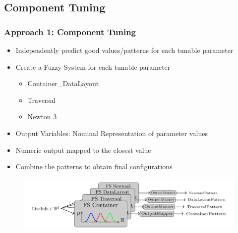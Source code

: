 \documentclass[
	10pt,
	t		%
]{beamer}
\begin{document}
\subsection{Component Tuning}
\begin{frame}
	\frametitle{Approach 1: Component Tuning}
	\begin{itemize}
		\item Independently predict good values/patterns for each tunable parameter
		\item Create a Fuzzy System for each tunable parameter
		      \begin{itemize}
			      \item Container\_DataLayout
			      \item Traversal
			      \item Newton 3
		      \end{itemize}
		\item Output Variables: Nominal Representation of parameter values
		\item Numeric output mapped to the closest value {\footnotesize \cite{Mohammed2022}}
		\item Combine the patterns to obtain final configurations
	\end{itemize}

	\begin{figure}
		\centering
		\includegraphics[width=1\textwidth]{figures/component-approach.png}
	\end{figure}

\end{frame}
\end{document}
